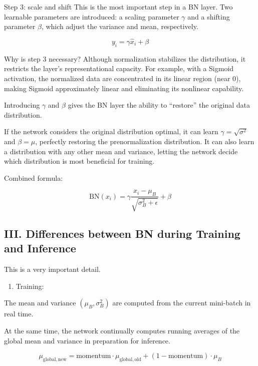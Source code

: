 Step 3: scale and shift
This is the most important step in a BN layer. Two learnable parameters are introduced: a scaling parameter \(\gamma\) and a shifting parameter \(\beta\), which adjust the variance and mean, respectively.

\[
y_i=\gamma\hat{x}_i+\beta
\]

Why is step 3 necessary?
Although normalization stabilizes the distribution, it restricts the layer's representational capacity. For example, with a Sigmoid activation, the normalized data are concentrated in its linear region (near 0), making Sigmoid approximately linear and eliminating its nonlinear capability.

Introducing \(\gamma\) and \(\beta\) gives the BN layer the ability to ``restore'' the original data distribution.

If the network considers the original distribution optimal, it can learn \(\gamma=\sqrt{\sigma^2}\) and \(\beta=\mu\), perfectly restoring the prenormalization distribution. It can also learn a distribution with any other mean and variance, letting the network decide which distribution is most beneficial for training.

Combined formula:

\[
\mathrm{BN}(x_i)=\gamma\frac{x_i-\mu_B}{\sqrt{\sigma_B^2+\epsilon}}+\beta
\]

\hypertarget{iii.-differences-between-bn-during-training-and-inference}{%
\subsection{III. Differences between BN during Training and Inference}\label{iii.-differences-between-bn-during-training-and-inference}}

This is a very important detail.

\begin{enumerate}
\def\labelenumi{\arabic{enumi}.}
\tightlist
\item
{}
  Training:
\end{enumerate}

The mean and variance \((\mu_B,\sigma_B^2)\) are computed from the current mini-batch in real time.

At the same time, the network continually computes running averages of the global mean and variance in preparation for inference.

\[
\mu_{\mathrm{global,new}}
= \mathrm{momentum}\cdot\mu_{\mathrm{global,old}}
+ (1-\mathrm{momentum})\cdot\mu_B
\]

